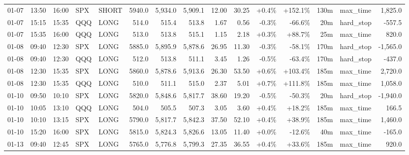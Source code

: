 \documentclass[11pt,a4paper,twoside]{article}
\begin{document}
\begin{landscape}
\begin{center}
\begin{longtable}{>{\color{txtmain}}l l l l l r r r r r r r r >{\color{txtmain}}l r}
01-07 & 13:50 & 16:00 & SPX & SHORT & 5940.0 & 5,934.0 & 5,909.1 & 12.00 & 30.25 & \textcolor{wingreen}{+0.4\%} & \textcolor{wingreen}{+152.1\%} & 130m & max\_time & \textcolor{wingreen}{1,825.0} \\
01-07 & 15:15 & 15:35 & QQQ & LONG & 514.0 & 515.4 & 513.8 & 1.67 & 0.56 & \textcolor{lossred}{-0.3\%} & \textcolor{lossred}{-66.6\%} & 20m & hard\_stop & \textcolor{lossred}{-557.5} \\
01-07 & 15:35 & 16:00 & QQQ & LONG & 513.0 & 513.8 & 515.1 & 1.15 & 2.18 & \textcolor{wingreen}{+0.3\%} & \textcolor{wingreen}{+88.7\%} & 25m & max\_time & \textcolor{wingreen}{820.0} \\
01-08 & 09:40 & 12:30 & SPX & LONG & 5885.0 & 5,895.9 & 5,878.6 & 26.95 & 11.30 & \textcolor{lossred}{-0.3\%} & \textcolor{lossred}{-58.1\%} & 170m & hard\_stop & \textcolor{lossred}{-1,565.0} \\
01-08 & 09:40 & 12:30 & QQQ & LONG & 512.0 & 513.8 & 511.1 & 3.45 & 1.26 & \textcolor{lossred}{-0.5\%} & \textcolor{lossred}{-63.4\%} & 170m & hard\_stop & \textcolor{lossred}{-437.0} \\
01-08 & 12:30 & 15:35 & SPX & LONG & 5860.0 & 5,878.6 & 5,913.6 & 26.30 & 53.50 & \textcolor{wingreen}{+0.6\%} & \textcolor{wingreen}{+103.4\%} & 185m & max\_time & \textcolor{wingreen}{2,720.0} \\
01-08 & 12:30 & 15:35 & QQQ & LONG & 510.0 & 511.1 & 515.0 & 2.37 & 5.01 & \textcolor{wingreen}{+0.7\%} & \textcolor{wingreen}{+111.8\%} & 185m & max\_time & \textcolor{wingreen}{1,058.0} \\
01-10 & 09:50 & 10:10 & SPX & LONG & 5820.0 & 5,848.6 & 5,817.7 & 38.60 & 19.20 & \textcolor{lossred}{-0.5\%} & \textcolor{lossred}{-50.3\%} & 20m & hard\_stop & \textcolor{lossred}{-1,940.0} \\
01-10 & 10:05 & 13:10 & QQQ & LONG & 504.0 & 505.5 & 507.3 & 3.05 & 3.60 & \textcolor{wingreen}{+0.4\%} & \textcolor{wingreen}{+18.2\%} & 185m & max\_time & \textcolor{wingreen}{166.5} \\
01-10 & 10:10 & 13:15 & SPX & LONG & 5790.0 & 5,817.7 & 5,842.3 & 37.50 & 52.10 & \textcolor{wingreen}{+0.4\%} & \textcolor{wingreen}{+38.9\%} & 185m & max\_time & \textcolor{wingreen}{1,460.0} \\
01-10 & 15:20 & 16:00 & SPX & LONG & 5815.0 & 5,824.3 & 5,826.6 & 13.05 & 11.40 & \textcolor{wingreen}{+0.0\%} & \textcolor{lossred}{-12.6\%} & 40m & max\_time & \textcolor{lossred}{-165.0} \\
01-13 & 09:40 & 12:45 & SPX & LONG & 5765.0 & 5,776.8 & 5,799.3 & 27.35 & 36.55 & \textcolor{wingreen}{+0.4\%} & \textcolor{wingreen}{+33.6\%} & 185m & max\_time & \textcolor{wingreen}{920.0} \\

\end{longtable}
\end{center}
\end{landscape}
\end{document}
